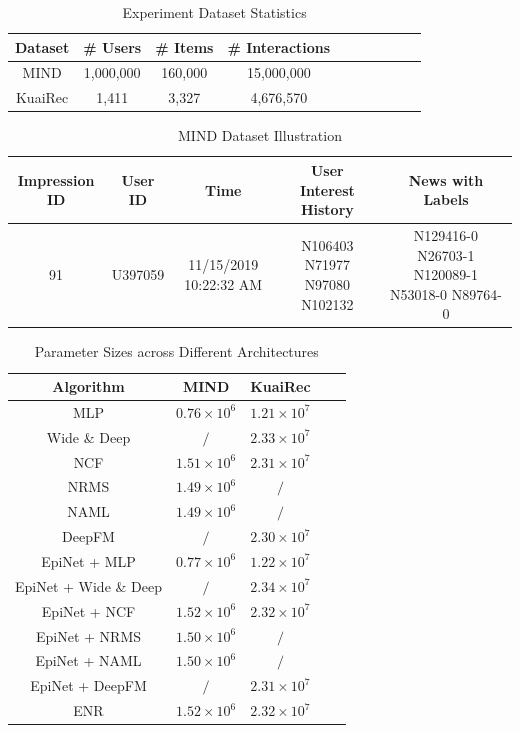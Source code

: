 \begin{table}[t!]
\small
    \centering
  \caption{Experiment Dataset Statistics}
  \vspace{-0.1in}
  \label{tab:stats}
  \begin{tabular}{cccccccccc}
    \toprule
    Dataset & \# Users & \# Items & \# Interactions\\
    \midrule
    MIND \cite{wu2020mind} & 1,000,000 & 160,000 & 15,000,000\\
    KuaiRec \cite{gao2022kuairec} & 1,411 & 3,327 & 4,676,570\\
  \bottomrule
\end{tabular}
\end{table}

\begin{table}[h]
\small
  \caption{MIND Dataset Illustration}
  \vspace{-0.1in}
  \label{tab:mind_example}
  \begin{tabular}{ccccc}
    \toprule
    Impression ID & User ID & Time & User Interest History & News with Labels\\
    \midrule 
    91 & U397059 & 11/15/2019 10:22:32 AM & N106403 N71977 N97080 N102132 & N129416-0 N26703-1 N120089-1 N53018-0 N89764-0\\
  \bottomrule
\end{tabular}
\vspace{-0.15in}
\end{table}

\begin{table}[t!]
\small
  \caption{Parameter Sizes across Different Architectures}
  \vspace{-0.1in}
  \label{tab:param}
  \begin{tabular}{ccccc}
    \toprule
    Algorithm & MIND & KuaiRec\\
    \midrule 
    MLP & $0.76 \times 10^6$ & $1.21 \times 10^7$\\
    Wide \& Deep & $/$ & $2.33 \times 10^7$\\
    NCF & $1.51 \times 10^6$ & $2.31 \times 10^7$\\
    NRMS & $1.49 \times 10^6$ & $/$\\ 
    NAML & $1.49 \times 10^6$ & $/$\\
    DeepFM & $/$ & $2.30 \times 10^7$ \\
    EpiNet + MLP & $0.77 \times 10^6$ & $1.22 \times 10^7$\\
    EpiNet + Wide \& Deep & $/$ & $2.34 \times 10^7$\\
    EpiNet + NCF & $1.52 \times 10^6$ & $2.32 \times 10^7$\\
    EpiNet + NRMS & $1.50 \times 10^6$ & $/$ \\
    EpiNet + NAML & $1.50 \times 10^6$ & $/$\\
    EpiNet + DeepFM & $/$ & $2.31 \times 10^7$ \\
    ENR & $1.52 \times 10^6$ & $2.32 \times 10^7$ \\
  \bottomrule
\end{tabular}
\vspace{-0.1in}
\end{table}

